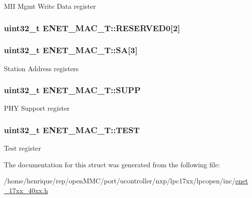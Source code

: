 M\-I\-I Mgmt Write Data register \hypertarget{structENET__MAC__T_a6e6d5f331b8f5ab0012d265d0a1ff6b1}{
\subsubsection[{R\-E\-S\-E\-R\-V\-E\-D0}]{\setlength{\rightskip}{0pt plus 5cm}uint32\-\_\-t E\-N\-E\-T\-\_\-\-M\-A\-C\-\_\-\-T\-::\-R\-E\-S\-E\-R\-V\-E\-D0\mbox{[}2\mbox{]}}}\label{structENET__MAC__T_a6e6d5f331b8f5ab0012d265d0a1ff6b1}
\hypertarget{structENET__MAC__T_a25214ef3698b23b87fea95b7158a11ad}{
\subsubsection[{S\-A}]{ uint32\-\_\-t E\-N\-E\-T\-\_\-\-M\-A\-C\-\_\-\-T\-::\-S\-A\mbox{[}3\mbox{]}}}\label{structENET__MAC__T_a25214ef3698b23b87fea95b7158a11ad}
Station Address registers \hypertarget{structENET__MAC__T_ad7232a883f980074136d81f8a15d8bb5}{
\subsubsection[{S\-U\-P\-P}]{ uint32\-\_\-t E\-N\-E\-T\-\_\-\-M\-A\-C\-\_\-\-T\-::\-S\-U\-P\-P}}\label{structENET__MAC__T_ad7232a883f980074136d81f8a15d8bb5}
P\-H\-Y Support register \hypertarget{structENET__MAC__T_a3ba308b4a368f475aa4b2136faa88f6f}{
\subsubsection[{T\-E\-S\-T}]{ uint32\-\_\-t E\-N\-E\-T\-\_\-\-M\-A\-C\-\_\-\-T\-::\-T\-E\-S\-T}}\label{structENET__MAC__T_a3ba308b4a368f475aa4b2136faa88f6f}
Test register 

The documentation for this struct was generated from the following file\-:\begin{DoxyCompactItemize}
\item 
/home/henrique/rep/open\-M\-M\-C/port/ucontroller/nxp/lpc17xx/lpcopen/inc/\hyperlink{enet__17xx__40xx_8h}{enet\-\_\-17xx\-\_\-40xx.\-h}\end{DoxyCompactItemize}
